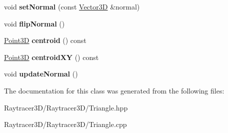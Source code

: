 \begin{DoxyCompactItemize}
void {\bfseries set\+Normal} (const \hyperlink{class_vector3_d}{Vector3D} \&normal)
\item 
\hypertarget{class_triangle_a1fe02e3810a30dca5e6ddf646f7f31a5}{}\label{class_triangle_a1fe02e3810a30dca5e6ddf646f7f31a5} 
void {\bfseries flip\+Normal} ()
\item 
\hypertarget{class_triangle_a8e187af2dd348e5c51a657ca066221ac}{}\label{class_triangle_a8e187af2dd348e5c51a657ca066221ac} 
\hyperlink{class_point3_d}{Point3D} {\bfseries centroid} () const
\item 
\hypertarget{class_triangle_a0e10ae200b1a7698a800ddfa06d8d00d}{}\label{class_triangle_a0e10ae200b1a7698a800ddfa06d8d00d} 
\hyperlink{class_point3_d}{Point3D} {\bfseries centroid\+XY} () const
\item 
\hypertarget{class_triangle_a0674ff79061f6413e6aa721e1ac5dd06}{}\label{class_triangle_a0674ff79061f6413e6aa721e1ac5dd06} 
void {\bfseries update\+Normal} ()
\end{DoxyCompactItemize}


The documentation for this class was generated from the following files\+:\begin{DoxyCompactItemize}
\item 
Raytracer3\+D/\+Raytracer3\+D/Triangle.\+hpp\item 
Raytracer3\+D/\+Raytracer3\+D/Triangle.\+cpp\end{DoxyCompactItemize}

